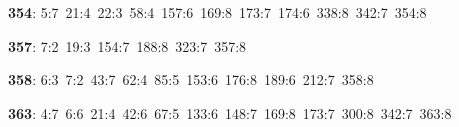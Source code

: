 \noindent \textbf{354}: 5:7\allowbreak\ 21:4\allowbreak\ 22:3\allowbreak\ 58:4\allowbreak\ 157:6\allowbreak\ 169:8\allowbreak\ 173:7\allowbreak\ 174:6\allowbreak\ 338:8\allowbreak\ 342:7\allowbreak\ 354:8\par
\noindent \textbf{357}: 7:2\allowbreak\ 19:3\allowbreak\ 154:7\allowbreak\ 188:8\allowbreak\ 323:7\allowbreak\ 357:8\par
\noindent \textbf{358}: 6:3\allowbreak\ 7:2\allowbreak\ 43:7\allowbreak\ 62:4\allowbreak\ 85:5\allowbreak\ 153:6\allowbreak\ 176:8\allowbreak\ 189:6\allowbreak\ 212:7\allowbreak\ 358:8\par
\noindent \textbf{363}: 4:7\allowbreak\ 6:6\allowbreak\ 21:4\allowbreak\ 42:6\allowbreak\ 67:5\allowbreak\ 133:6\allowbreak\ 148:7\allowbreak\ 169:8\allowbreak\ 173:7\allowbreak\ 300:8\allowbreak\ 342:7\allowbreak\ 363:8\par
